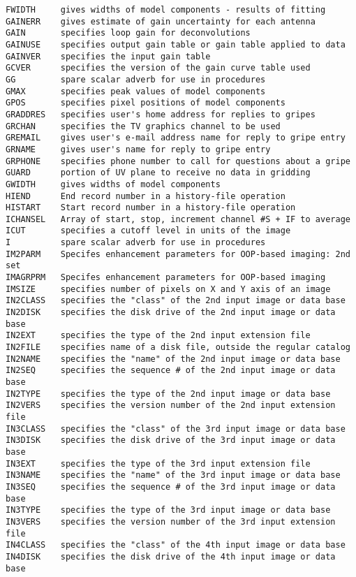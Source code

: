 \begin{verbatim}
FWIDTH     gives widths of model components - results of fitting
GAINERR    gives estimate of gain uncertainty for each antenna
GAIN       specifies loop gain for deconvolutions
GAINUSE    specifies output gain table or gain table applied to data
GAINVER    specifies the input gain table
GCVER      specifies the version of the gain curve table used
GG         spare scalar adverb for use in procedures
GMAX       specifies peak values of model components
GPOS       specifies pixel positions of model components
GRADDRES   specifies user's home address for replies to gripes
GRCHAN     specifies the TV graphics channel to be used
GREMAIL    gives user's e-mail address name for reply to gripe entry
GRNAME     gives user's name for reply to gripe entry
GRPHONE    specifies phone number to call for questions about a gripe
GUARD      portion of UV plane to receive no data in gridding
GWIDTH     gives widths of model components
HIEND      End record number in a history-file operation
HISTART    Start record number in a history-file operation
ICHANSEL   Array of start, stop, increment channel #S + IF to average
ICUT       specifies a cutoff level in units of the image
I          spare scalar adverb for use in procedures
IM2PARM    Specifes enhancement parameters for OOP-based imaging: 2nd set
IMAGRPRM   Specifes enhancement parameters for OOP-based imaging
IMSIZE     specifies number of pixels on X and Y axis of an image
IN2CLASS   specifies the "class" of the 2nd input image or data base
IN2DISK    specifies the disk drive of the 2nd input image or data base
IN2EXT     specifies the type of the 2nd input extension file
IN2FILE    specifies name of a disk file, outside the regular catalog
IN2NAME    specifies the "name" of the 2nd input image or data base
IN2SEQ     specifies the sequence # of the 2nd input image or data base
IN2TYPE    specifies the type of the 2nd input image or data base
IN2VERS    specifies the version number of the 2nd input extension file
IN3CLASS   specifies the "class" of the 3rd input image or data base
IN3DISK    specifies the disk drive of the 3rd input image or data base
IN3EXT     specifies the type of the 3rd input extension file
IN3NAME    specifies the "name" of the 3rd input image or data base
IN3SEQ     specifies the sequence # of the 3rd input image or data base
IN3TYPE    specifies the type of the 3rd input image or data base
IN3VERS    specifies the version number of the 3rd input extension file
IN4CLASS   specifies the "class" of the 4th input image or data base
IN4DISK    specifies the disk drive of the 4th input image or data base

\end{verbatim}
